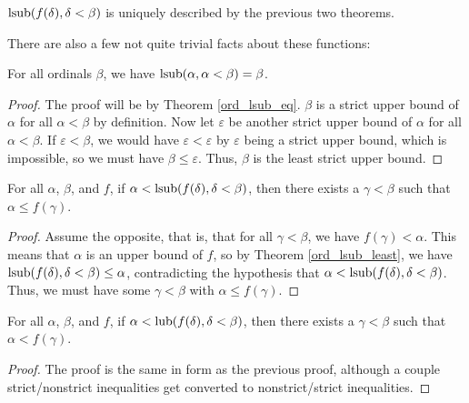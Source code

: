 \documentclass[../../math.tex]{subfiles}
\begin{document}
\begin{theorem} \label{ord_lsub_eq}
    $\operatorname{lsub}(f(\delta), \delta < \beta)$ is uniquely described by the previous two
    theorems.
\end{theorem}

There are also a few not quite trivial facts about these functions:

\begin{theorem} \label{ord_lsub_self_eq}
    For all ordinals $\beta$, we have $\operatorname{lsub}(\alpha, \alpha < \beta) = \beta$.
\end{theorem}
\begin{proof}
    The proof will be by Theorem \ref{ord_lsub_eq}.  $\beta$ is a strict upper
    bound of $\alpha$ for all $\alpha < \beta$ by definition.  Now let
    $\varepsilon$ be another strict upper bound of $\alpha$ for all $\alpha <
    \beta$.  If $\varepsilon < \beta$, we would have $\varepsilon < \varepsilon$
    by $\varepsilon$ being a strict upper bound, which is impossible, so we must
    have $\beta \leq \varepsilon$.  Thus, $\beta$ is the least strict upper
    bound.
\end{proof}

\begin{theorem} \label{ord_lsub_in}
    For all $\alpha$, $\beta$, and $f$, if $\alpha < \operatorname{lsub}(f(\delta), \delta <
    \beta)$, then there exists a $\gamma < \beta$ such that $\alpha \leq
    f(\gamma)$.
\end{theorem}
\begin{proof}
    Assume the opposite, that is, that for all $\gamma < \beta$, we have
    $f(\gamma) < \alpha$.  This means that $\alpha$ is an upper bound of $f$, so
    by Theorem \ref{ord_lsub_least}, we have $\operatorname{lsub}(f(\delta), \delta < \beta)
    \leq \alpha$, contradicting the hypothesis that $\alpha < \operatorname{lsub}(f(\delta),
    \delta < \beta)$.  Thus, we must have some $\gamma < \beta$ with $\alpha
    \leq f(\gamma)$.
\end{proof}

\begin{theorem} \label{ord_lub_in}
    For all $\alpha$, $\beta$, and $f$, if $\alpha < \operatorname{lub}(f(\delta), \delta <
    \beta)$, then there exists a $\gamma < \beta$ such that $\alpha <
    f(\gamma)$.
\end{theorem}
\begin{proof}
    The proof is the same in form as the previous proof, although a couple
    strict/nonstrict inequalities get converted to nonstrict/strict
    inequalities.
\end{proof}
\end{document}
